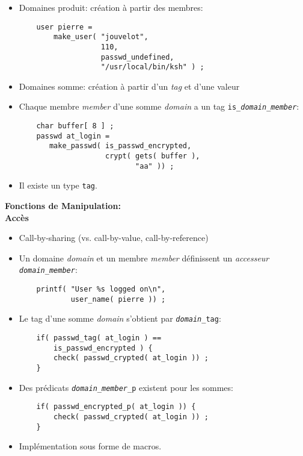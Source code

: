 \documentclass[11pt]{article}
\begin{document}
{\begin{itemize}
\item Domaines produit: création à partir des membres:

\begin{verbatim}
    user pierre = 
        make_user( "jouvelot", 
                   110, 
                   passwd_undefined,
                   "/usr/local/bin/ksh" ) ;
\end{verbatim}
\item Domaines somme: création à partir d'un {\em tag} et d'une
valeur
\item Chaque membre {\em member} d'une somme {\em domain} a un
tag {\tt is\_{\em domain}\_{\em member}}:

\begin{verbatim}
    char buffer[ 8 ] ;
    passwd at_login = 
       make_passwd( is_passwd_encrypted,
                    crypt( gets( buffer ), 
                           "aa" )) ;
\end{verbatim}
\item Il existe un type {\tt tag}.
\end{itemize}

\newpage

\begin{center}
{\huge\bf Fonctions de Manipulation: \\
Accès}
\end{center}

\vskip 2cm

\begin{itemize}
\item Call-by-sharing (vs. call-by-value, call-by-reference)
\item Un domaine {\em domain} et un membre {\em member} définissent un
{\em accesseur} {\tt {\em domain}\_{\em member}}:

\begin{verbatim}
    printf( "User %s logged on\n", 
            user_name( pierre )) ;
\end{verbatim}
\item Le tag d'une somme {\em domain} s'obtient par {\tt {\em domain}\_tag}:

\begin{verbatim}
    if( passwd_tag( at_login ) == 
        is_passwd_encrypted ) {
        check( passwd_crypted( at_login )) ;
    }
\end{verbatim}
\item Des prédicats {\tt {\em domain}\_{\em member}\_p} existent pour
les som\-mes: 

\begin{verbatim}
    if( passwd_encrypted_p( at_login )) {
        check( passwd_crypted( at_login )) ;
    }
\end{verbatim}
\item Implémentation sous forme de macros.
\end{itemize}

}
\end{document}
